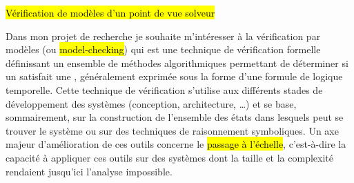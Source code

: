 \label{sec:projet_recherche}
\vspace{10pt}

\hl{Vérification de modèles d’un point de vue solveur}
\vspace{10pt}



Dans mon projet de recherche je souhaite m'intéresser à la vérification par
modèles (ou \hl{{model-checking}}) qui est une technique de vérification
formelle définissant un ensemble de méthodes algorithmiques permettant de
déterminer si un  satisfait une , généralement exprimée sous la forme d'une formule de logique
temporelle. Cette technique de vérification s'utilise aux différents stades de
développement des systèmes (conception, architecture, \dots) et se base,
sommairement, sur la construction de l'ensemble des états dans lesquels peut se
trouver le système ou sur des techniques de raisonnement symboliques. Un axe
majeur d'amélioration de ces outils concerne le \hl{passage à l'échelle},
c'est-à-dire la capacité à appliquer ces outils sur des systèmes dont la taille
et la complexité rendaient jusqu'ici l'analyse impossible.\\

